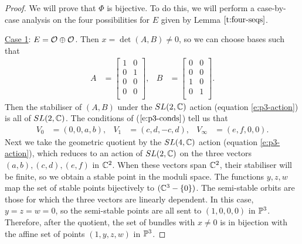 	\begin{proof}
	 	We will prove that $\Phi$ is bijective. To do this, we will perform a case-by-case analysis on the four possibilities for $E$ given by Lemma $\ref{t:four-seqs}$.
		
		\underline{Case 1}: $E = \mathcal{O}\oplus \mathcal{O}$. Then $x = \det(A,B) \neq 0$, so we can choose bases such that
		\begin{align*}
			A &= \begin{bmatrix}
			1 & 0\\
			0 & 1\\
			0 & 0\\
			0 & 0\\
			\end{bmatrix}, & 
			B &= \begin{bmatrix}
			0 & 0\\
			0 & 0\\
			1 & 0\\
			0 & 1\\
			\end{bmatrix}.
		\end{align*}
		Then the stabiliser of $(A,B)$ under the $SL(2,\mathbb{C})$ action (equation \ref{e:p3-action}) is all of $SL(2,\mathbb{C})$. The conditions of ($\ref{e:p3-conds}$) tell us that 
		\begin{align}
			V_0 &= (0,0,a,b), & V_1 &= (c,d,-c,d), & V_\infty &=(e,f,0,0).
		\end{align}
		Next we take the geometric quotient by the $SL(4,\mathbb{C})$ action (equation \ref{e:p3-action}), which reduces to an action of $SL(2,\mathbb{C})$ on the three vectors $(a,b),(c,d),(e,f)$ in $\mathbb{C}^2$. When these vectors span $\mathbb{C}^2$, their stabiliser will be finite, so we obtain a stable point in the moduli space. The functions $y,z,w$ map the set of stable points bijectively to $(\mathbb{C}^3 - \{0\})$. The semi-stable orbits are those for which the three vectors are linearly dependent. In this case, $y = z = w = 0$, so the semi-stable points are all sent to $(1,0,0,0)$ in $\mathbb{P}^3$. Therefore, after the quotient, the set of bundles with $x \neq 0$ is in bijection with the affine set of points $(1,y,z,w)$ in $\mathbb{P}^3$.
		

\end{proof}
